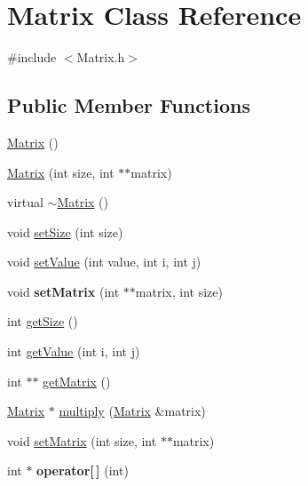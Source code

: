 \hypertarget{classMatrix}{}\section{Matrix Class Reference}
\label{classMatrix}


{\ttfamily \#include $<$Matrix.\+h$>$}

\subsection*{Public Member Functions}
\begin{DoxyCompactItemize}
\item 
\hyperlink{classMatrix_a2dba13c45127354c9f75ef576f49269b}{Matrix} ()
\item 
\hyperlink{classMatrix_a0c36e51b0557906e18874b449084c922}{Matrix} (int size, int $\ast$$\ast$matrix)
\item 
virtual \hyperlink{classMatrix_a9b1c3627f573d78a2f08623fdfef990f}{$\sim$\+Matrix} ()
\item 
void \hyperlink{classMatrix_a81229f23ae174ff8c3cb9cb6c41ff87d}{set\+Size} (int size)
\item 
void \hyperlink{classMatrix_a1cc6730760fc5417d080d68a31c30436}{set\+Value} (int value, int i, int j)
\item 
\hypertarget{classMatrix_a6d1e4d50294f471fb311ad03d0c4cb4f}{}void {\bfseries set\+Matrix} (int $\ast$$\ast$matrix, int size)\label{classMatrix_a6d1e4d50294f471fb311ad03d0c4cb4f}

\item 
int \hyperlink{classMatrix_ad6810e0bc4061dd3492a99aa60107018}{get\+Size} ()
\item 
int \hyperlink{classMatrix_ac61c1914809e815b008d2ad55473a982}{get\+Value} (int i, int j)
\item 
int $\ast$$\ast$ \hyperlink{classMatrix_a4f142b8c81336b5f4c494ae7faa1caac}{get\+Matrix} ()
\item 
\hyperlink{classMatrix}{Matrix} $\ast$ \hyperlink{classMatrix_a7f0688366fee2056c0750f6dd401c344}{multiply} (\hyperlink{classMatrix}{Matrix} \&matrix)
\item 
void \hyperlink{classMatrix_a17b0e0d2d2eed781cc346d27388a6ddc}{set\+Matrix} (int size, int $\ast$$\ast$matrix)
\item 
\hypertarget{classMatrix_ad6a6664dc9b0babecfa50b3a7707f302}{}int $\ast$ {\bfseries operator\mbox{[}$\,$\mbox{]}} (int)\label{classMatrix_ad6a6664dc9b0babecfa50b3a7707f302}

\end{DoxyCompactItemize}


